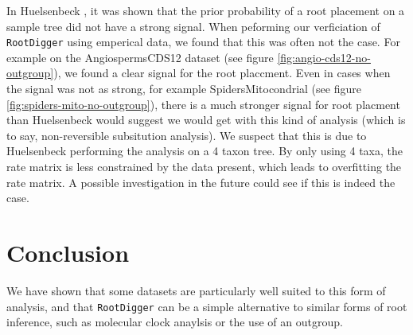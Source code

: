 \documentclass{article}
\newcommand{\RootDiggertt}{\texttt{RootDigger}}
\begin{document}
In Huelsenbeck \cite{huelsenbeck_inferring_2002}, it was shown that the prior
probability of a root placement on a sample tree did not have a strong signal.
When peforming our verficiation of \RootDiggertt{} using emperical data, we
found that this was often not the case. For example on the AngiospermsCDS12
dataset (see figure \ref{fig:angio-cds12-no-outgroup}), we found a clear signal
for the root placcment. Even in cases when the signal was not as strong, for
example SpidersMitocondrial (see figure \ref{fig:spiders-mito-no-outgroup}),
there is a much stronger signal for root placment than Huelsenbeck would suggest
we would get with this kind of analysis (which is to say, non-reversible
subsitution analysis). We suspect that this is due to Huelsenbeck performing the
analysis on a 4 taxon tree. By only using 4 taxa, the rate matrix is less
constrained by the data present, which leads to overfitting the rate matrix. A
possible investigation in the future could see if this is indeed the case.

\section{Conclusion}

We have shown that some datasets are particularly well suited to this form of
analysis, and that \RootDiggertt{} can be a simple alternative to similar forms
of root inference, such as molecular clock anaylsis or the use of an outgroup.



\end{document}
